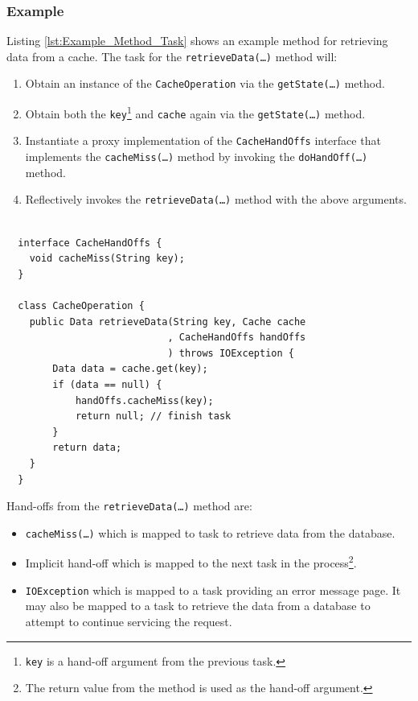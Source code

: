 \documentclass[prodmode]{style/acmlarge}
\begin{document}
\subsubsection*{Example}

Listing \ref{lst:Example_Method_Task} shows an example method for retrieving
data from a cache.  The task for the \texttt{retrieve\-Data(\ldots)} method will:
\begin{enumerate}
  \item Obtain an instance of the \texttt{CacheOperation} via the \texttt{getState(\ldots)} method.
  \item Obtain both the \texttt{key}\footnote{\texttt{key} is a hand-off argument from the previous task.} and \texttt{cache} again via the \texttt{getState(\ldots)} method.
  \item Instantiate a proxy implementation of the \texttt{CacheHandOffs} interface that implements the \texttt{cacheMiss(\ldots)} method by invoking the \texttt{doHandOff(\ldots)} method. 
  \item Reflectively invokes the \texttt{retrieveData(\ldots)} method with the above arguments.
\end{enumerate}

\lstset{caption=Example developer code of a task for retrieving data from a cache\protect\footnotemark}
\begin{lstlisting}[float,label=lst:Example_Method_Task]

  interface CacheHandOffs {
    void cacheMiss(String key);
  }

  class CacheOperation {
    public Data retrieveData(String key, Cache cache
                            , CacheHandOffs handOffs
                            ) throws IOException {
        Data data = cache.get(key);
        if (data == null) {
            handOffs.cacheMiss(key);
            return null; // finish task
        }
        return data;
    }
  }
\end{lstlisting}

Hand-offs from the \texttt{retrieveData(\ldots)} method are:
\begin{itemize}
  \item \texttt{cacheMiss(\ldots)} which is mapped to task to retrieve data from the database.
  \item Implicit hand-off which is mapped to the next task in the process\footnote{The return value from the method is used as the hand-off argument.}.
  \item \texttt{IOException} which is mapped to a task providing an error message page.  It may also be mapped to a task to retrieve the data from a database to attempt to continue servicing the request.
\end{itemize}
\end{document}
